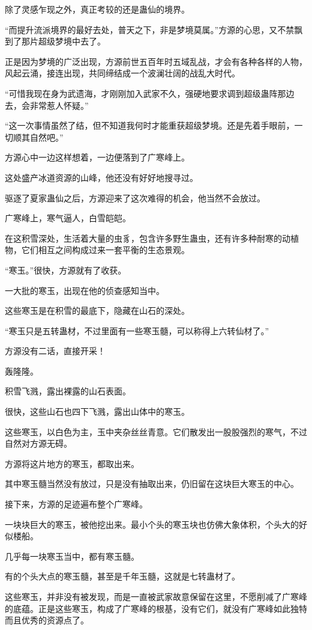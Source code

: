 \begin{this_body}
除了灵感乍现之外，真正考较的还是蛊仙的境界。

“而提升流派境界的最好去处，普天之下，非是梦境莫属。”方源的心思，又不禁飘到了那片超级梦境中去了。

正是因为梦境的广泛出现，方源前世五百年时五域乱战，才会有各种各样的人物，风起云涌，接连出现，共同缔结成一个波澜壮阔的战乱大时代。

“可惜我现在身为武遗海，才刚刚加入武家不久，强硬地要求调到超级蛊阵那边去，会非常惹人怀疑。”

“这一次事情虽然了结，但不知道我何时才能重获超级梦境。还是先着手眼前，一切顺其自然吧。”

方源心中一边这样想着，一边便落到了广寒峰上。

这处盛产冰道资源的山峰，他还没有好好地搜寻过。

驱逐了夏家蛊仙之后，方源迎来了这次难得的机会，他当然不会放过。

广寒峰上，寒气逼人，白雪皑皑。

在这积雪深处，生活着大量的虫豸，包含许多野生蛊虫，还有许多种耐寒的动植物，它们相互之间构成过来一套平衡的生态景观。

“寒玉。”很快，方源就有了收获。

一大批的寒玉，出现在他的侦查感知当中。

这些寒玉是在积雪的最底下，隐藏在山石的深处。

“寒玉只是五转蛊材，不过里面有一些寒玉髓，可以称得上六转仙材了。”

方源没有二话，直接开采！

轰隆隆。

积雪飞溅，露出裸露的山石表面。

很快，这些山石也四下飞溅，露出山体中的寒玉。

这些寒玉，以白色为主，玉中夹杂丝丝青意。它们散发出一股股强烈的寒气，不过自然对方源无碍。

方源将这片地方的寒玉，都取出来。

其中寒玉髓当然没有放过，只是没有抽取出来，仍旧留在这块巨大寒玉的中心。

接下来，方源的足迹遍布整个广寒峰。

一块块巨大的寒玉，被他挖出来。最小个头的寒玉块也仿佛大象体积，个头大的好似楼船。

几乎每一块寒玉当中，都有寒玉髓。

有的个头大点的寒玉髓，甚至是千年玉髓，这就是七转蛊材了。

这些寒玉，并非没有被发现，而是一直被武家故意保留在这里，不愿削减了广寒峰的底蕴。正是这些寒玉，构成了广寒峰的根基，没有它们，就没有广寒峰如此独特而且优秀的资源点了。


\end{this_body}

